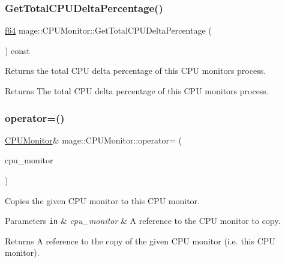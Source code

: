 \subsubsection{\texorpdfstring{Get\+Total\+C\+P\+U\+Delta\+Percentage()}{GetTotalCPUDeltaPercentage()}}
{\footnotesize\ttfamily \hyperlink{namespacemage_ab935747c6941320bd6214b5a5f265b09}{f64} mage\+::\+C\+P\+U\+Monitor\+::\+Get\+Total\+C\+P\+U\+Delta\+Percentage (\begin{DoxyParamCaption}{ }\end{DoxyParamCaption}) const\hspace{0.3cm}{\ttfamily [noexcept]}}

Returns the total C\+PU delta percentage of this C\+PU monitor\textquotesingle{}s process.

\begin{DoxyReturn}{Returns}
The total C\+PU delta percentage of this C\+PU monitor\textquotesingle{}s process. 
\end{DoxyReturn}
\hypertarget{classmage_1_1_c_p_u_monitor_a6009df0994652d011a78d1f12013e599}{}\label{classmage_1_1_c_p_u_monitor_a6009df0994652d011a78d1f12013e599} 
\subsubsection{\texorpdfstring{operator=()}{operator=()}\hspace{0.1cm}{\footnotesize\ttfamily [1/2]}}
{\footnotesize\ttfamily \hyperlink{classmage_1_1_c_p_u_monitor}{C\+P\+U\+Monitor}\& mage\+::\+C\+P\+U\+Monitor\+::operator= (\begin{DoxyParamCaption}\item[{const \hyperlink{classmage_1_1_c_p_u_monitor}{C\+P\+U\+Monitor} \&}]{cpu\+\_\+monitor }\end{DoxyParamCaption})}

Copies the given C\+PU monitor to this C\+PU monitor.


\begin{DoxyParams}[1]{Parameters}
\mbox{\tt in}  & {\em cpu\+\_\+monitor} & A reference to the C\+PU monitor to copy. \\
\hline
\end{DoxyParams}
\begin{DoxyReturn}{Returns}
A reference to the copy of the given C\+PU monitor (i.\+e. this C\+PU monitor). 
\end{DoxyReturn}
\hypertarget{classmage_1_1_c_p_u_monitor_ad931f354e4191429937cb2c3e44290f1}{}\label{classmage_1_1_c_p_u_monitor_ad931f354e4191429937cb2c3e44290f1} 
